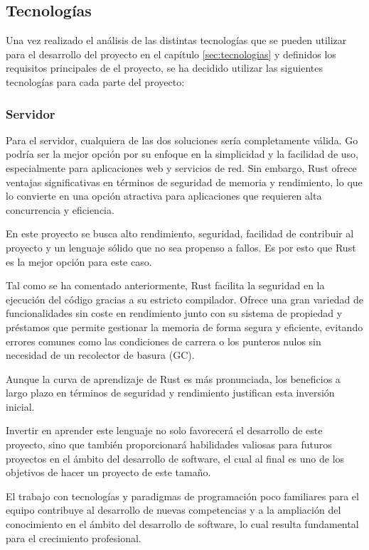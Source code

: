 \subsection{Tecnologías}
Una vez realizado el análisis de las distintas tecnologías que se pueden utilizar para el desarrollo del proyecto en el capítulo \ref{sec:tecnologias} y definidos los requisitos principales de el proyecto, se ha decidido utilizar las siguientes tecnologías para cada parte del proyecto:

\subsubsection{Servidor}
Para el servidor, cualquiera de las dos soluciones sería completamente válida. Go podría ser la mejor opción por su enfoque en la simplicidad y la facilidad de uso, especialmente para aplicaciones web y servicios de red. Sin embargo, Rust ofrece ventajas significativas en términos de seguridad de memoria y rendimiento, lo que lo convierte en una opción atractiva para aplicaciones que requieren alta concurrencia y eficiencia.

En este proyecto se busca alto rendimiento, seguridad, facilidad de contribuir al proyecto y un lenguaje sólido que no sea propenso a fallos.
Es por esto que Rust es la mejor opción para este caso. \parencite{rust-for-safety-and-performance}

Tal como se ha comentado anteriormente, Rust facilita la seguridad en la ejecución del código gracias a su estricto compilador.
Ofrece una gran variedad de funcionalidades sin coste en rendimiento junto con su sistema de propiedad y préstamos que permite gestionar la memoria de forma segura y eficiente, evitando errores comunes como las condiciones de carrera o los punteros nulos sin necesidad de un recolector de basura (GC).

Aunque la curva de aprendizaje de Rust es más pronunciada, los beneficios a largo plazo en términos de seguridad y rendimiento justifican esta inversión inicial.

Invertir en aprender este lenguaje no solo favorecerá el desarrollo de este proyecto, sino que también proporcionará habilidades valiosas para futuros proyectos en el ámbito del desarrollo de software, el cual al final es uno de los objetivos de hacer un proyecto de este tamaño.

El trabajo con tecnologías y paradigmas de programación poco familiares para el equipo contribuye al desarrollo de nuevas competencias y a la ampliación del conocimiento en el ámbito del desarrollo de software, lo cual resulta fundamental para el crecimiento profesional.

